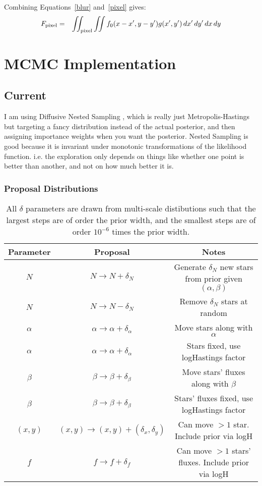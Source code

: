 \documentclass[letterpaper, 11pt]{article}
\begin{document}
Combining Equations~\ref{blur} and~\ref{pixel} gives:
\begin{eqnarray}
F_{\rm{pixel}} &=& \iint_{\rm{pixel}} \iint f_0(x-x', y-y')
g(x', y') \, dx' \, dy' \,dx\,dy
\end{eqnarray}

\section{MCMC Implementation}
\subsection{Current}
I am using Diffusive Nested Sampling \citep{dnest}, which is really just
Metropolis-Hastings but targeting a fancy distribution instead of the actual
posterior, and then assigning importance weights when you want the posterior.
Nested Sampling is good because it is invariant under monotonic transformations
of the likelihood function. i.e. the exploration only depends on things like
whether one point is better than another, and not on how much better it is.

\subsubsection{Proposal Distributions}

\begin{table}
\begin{center}
\begin{tabular}{c|c|c}
Parameter & Proposal & Notes\\
\hline
$N$ & $N \to N + \delta_N$ & Generate $\delta_N$ new stars from prior given
$(\alpha, \beta)$\\
$N$ & $N \to N - \delta_N$ & Remove $\delta_N$ stars at random\\
$\alpha$ & $\alpha \to \alpha + \delta_\alpha$ & Move stars along with $\alpha$
\\
$\alpha$ & $\alpha \to \alpha + \delta_\alpha$ & Stars fixed, use logHastings
factor \\
$\beta$ & $\beta \to \beta + \delta_\beta$ & Move stars' fluxes along with
$\beta$\\
$\beta$ & $\beta \to \beta + \delta_\beta$ & Stars' fluxes fixed, use
logHastings factor \\
$(x,y)$ & $(x,y) \to (x,y)+(\delta_x, \delta_y)$ & Can move $>1$ star.
Include prior via logH \\
$f$ & $f \to f + \delta_f$ & Can move $>1$ stars' fluxes. Include prior
via logH
\end{tabular}
\end{center}
\caption{All $\delta$ parameters are drawn from multi-scale distibutions such
that the largest steps are of order the prior width, and the smallest steps
are of order $10^{-6}$ times the prior width.\label{proposals}}
\end{table}
\end{document}
